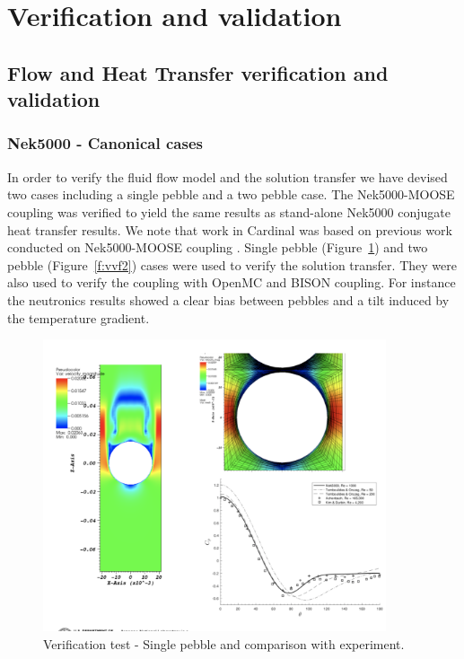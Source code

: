\section{Verification and validation}
\label{ss:c3}

\subsection{Flow and Heat Transfer verification and validation}

\subsubsection{Nek5000 - Canonical cases}
In order to verify the fluid flow model and the solution transfer we have devised two cases including a single pebble and a two pebble case. The Nek5000-MOOSE coupling was verified to yield the same results as stand-alone Nek5000 conjugate heat transfer results. We note that work in Cardinal was based on previous work conducted on Nek5000-MOOSE coupling \cite{novak2018preliminary}. Single pebble (Figure~\ref{f:vvf1}) and two pebble (Figure~\ref{f:vvf2}) cases were used to verify the solution transfer. They were also used to verify the coupling with OpenMC and BISON coupling. For instance the neutronics results showed a clear bias between pebbles and a tilt induced by the temperature gradient.

\begin{figure}[!h]
\centering
\includegraphics[clip=true,width=0.9\textwidth]{Figures/pb_vv1}
\caption{Verification test - Single pebble and comparison with experiment.}
\label{f:vvf1}
\end{figure}

